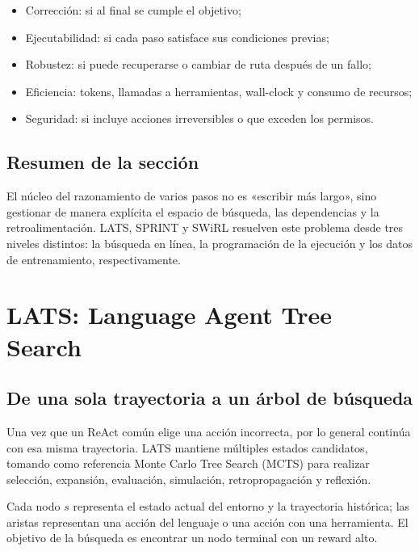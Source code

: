 \documentclass[a4paper]{article}
\begin{document}
\begin{itemize}
    \item Corrección: si al final se cumple el objetivo;
    \item Ejecutabilidad: si cada paso satisface sus condiciones previas;
    \item Robustez: si puede recuperarse o cambiar de ruta después de un fallo;
    \item Eficiencia: tokens, llamadas a herramientas, wall-clock y consumo de recursos;
    \item Seguridad: si incluye acciones irreversibles o que exceden los permisos.
\end{itemize}

\subsection{Resumen de la sección}

El núcleo del razonamiento de varios pasos no es «escribir más largo», sino gestionar de manera explícita el espacio de búsqueda, las dependencias y la retroalimentación. LATS, SPRINT y SWiRL resuelven este problema desde tres niveles distintos: la búsqueda en línea, la programación de la ejecución y los datos de entrenamiento, respectivamente.
\section{LATS: Language Agent Tree Search}

\subsection{De una sola trayectoria a un árbol de búsqueda}

Una vez que un ReAct común elige una acción incorrecta, por lo general continúa con esa misma trayectoria. LATS mantiene múltiples estados candidatos, tomando como referencia Monte Carlo Tree Search (MCTS) para realizar selección, expansión, evaluación, simulación, retropropagación y reflexión.



Cada nodo $s$ representa el estado actual del entorno y la trayectoria histórica; las aristas representan una acción del lenguaje o una acción con una herramienta. El objetivo de la búsqueda es encontrar un nodo terminal con un reward alto.
\end{document}
